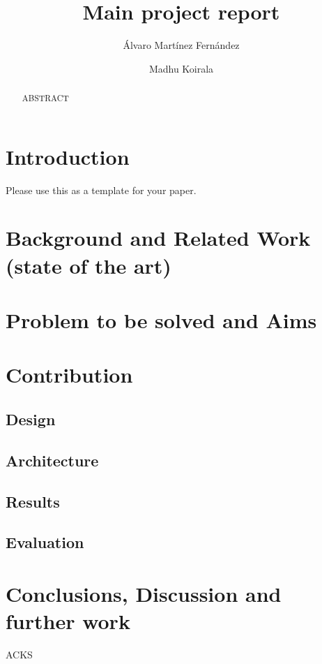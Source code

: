 \documentclass{jot}
\title{Main project report}
\author[affiliation=UiT, nowrap]
    {\'{A}lvaro Mart\'{i}nez Fern\'{a}ndez}
    { is a master student in Computer Science at the University of Troms\o. You can contact him at \email{afe026@uit.no}}
\author[affiliation=UiT, nowrap]
    {Madhu Koirala}
    {is a master student in Computer Science at the University of Troms\o. You can contact him at \email{mko075@uit.no}}
\affiliation{UiT}{University of Troms\o, Norway\\
\url{https://uit.no/startsida}}
\begin{document}
\begin{abstract}
ABSTRACT
\end{abstract}


\section{Introduction}

Please use this as a template for your paper.

\section{Background and Related Work (state of the art)}

\section{Problem to be solved and Aims}

\section{Contribution}

\subsection{Design}
\subsection{Architecture}
\subsection{Results}
\subsection{Evaluation}

\section{Conclusions, Discussion and further work}

\abouttheauthors

\begin{acknowledgments}
ACKS
\end{acknowledgments}
\end{document}
